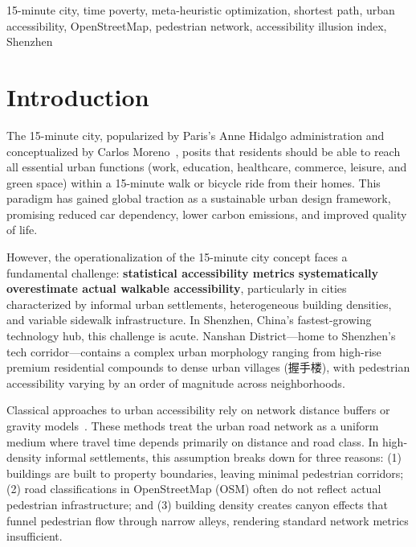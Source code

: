 \documentclass[journal]{IEEEtran}
\begin{document}
\begin{IEEEkeywords}
15-minute city, time poverty, meta-heuristic optimization, shortest path, urban accessibility, OpenStreetMap, pedestrian network, accessibility illusion index, Shenzhen
\end{IEEEkeywords}

\IEEEpeerreviewmaketitle

\section{Introduction}
\label{sec:introduction}

The 15-minute city, popularized by Paris's Anne Hidalgo administration and conceptualized by Carlos Moreno~\cite{moreno202115}, posits that residents should be able to reach all essential urban functions (work, education, healthcare, commerce, leisure, and green space) within a 15-minute walk or bicycle ride from their homes. This paradigm has gained global traction as a sustainable urban design framework, promising reduced car dependency, lower carbon emissions, and improved quality of life.

However, the operationalization of the 15-minute city concept faces a fundamental challenge: \textbf{statistical accessibility metrics systematically overestimate actual walkable accessibility}, particularly in cities characterized by informal urban settlements, heterogeneous building densities, and variable sidewalk infrastructure. In Shenzhen, China's fastest-growing technology hub, this challenge is acute. Nanshan District---home to Shenzhen's tech corridor---contains a complex urban morphology ranging from high-rise premium residential compounds to dense urban villages (握手楼), with pedestrian accessibility varying by an order of magnitude across neighborhoods.

Classical approaches to urban accessibility rely on network distance buffers or gravity models~\cite{geurs2004accessibility}. These methods treat the urban road network as a uniform medium where travel time depends primarily on distance and road class. In high-density informal settlements, this assumption breaks down for three reasons: (1) buildings are built to property boundaries, leaving minimal pedestrian corridors; (2) road classifications in OpenStreetMap (OSM) often do not reflect actual pedestrian infrastructure; and (3) building density creates canyon effects that funnel pedestrian flow through narrow alleys, rendering standard network metrics insufficient.
\end{document}
